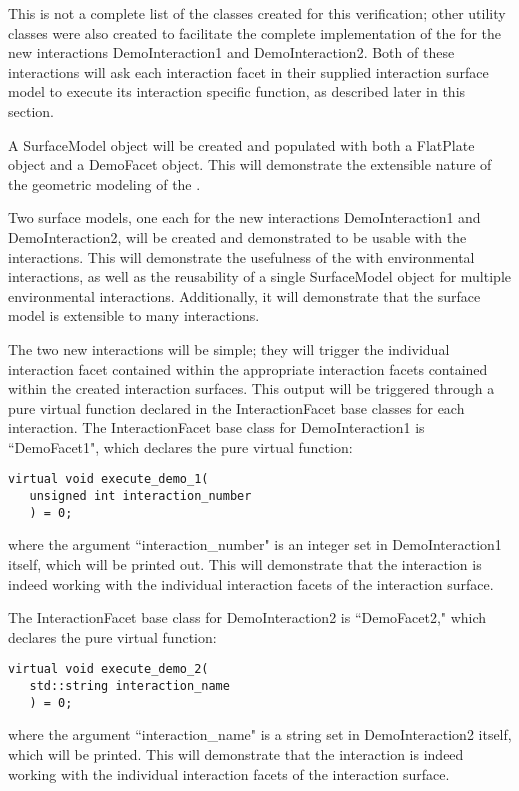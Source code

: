 \begin{description}
This is not a complete list of the classes created for this verification;
other utility classes were also created to facilitate the complete
implementation of the \ModelDesc for the new interactions
DemoInteraction1 and DemoInteraction2. Both of these interactions
will ask each interaction facet in their supplied interaction
surface model to execute its interaction specific function, as described
later in this section.

A SurfaceModel object will be created and populated with both a FlatPlate
object and a DemoFacet object. This will demonstrate the extensible
nature of the geometric modeling of the \ModelDesc.

Two surface models, one each for the new interactions DemoInteraction1
and DemoInteraction2, will be created and demonstrated to be usable
with the interactions. This will demonstrate the usefulness of the
\ModelDesc with environmental interactions, as well as
the reusability of a single SurfaceModel object for multiple
environmental interactions. Additionally, it will demonstrate that
the surface model is extensible to many interactions.

The two new interactions will be simple; they will trigger the individual
interaction facet contained within the appropriate interaction facets
contained within the created interaction surfaces. This output will
be triggered through a pure virtual function declared in the
InteractionFacet base classes for each interaction. The InteractionFacet
base class for DemoInteraction1 is ``DemoFacet1", which declares
the pure virtual function:

\begin{verbatim}
virtual void execute_demo_1(
   unsigned int interaction_number
   ) = 0;
\end{verbatim}

where the argument ``interaction\_number" is an integer set in
DemoInteraction1 itself, which will be printed out. This will
demonstrate that the interaction is indeed working with the individual
interaction facets of the interaction surface.

The InteractionFacet base class for DemoInteraction2 is ``DemoFacet2,"
which declares the pure virtual function:

\begin{verbatim}
virtual void execute_demo_2(
   std::string interaction_name
   ) = 0;
\end{verbatim}

where the argument ``interaction\_name" is a string set in
DemoInteraction2 itself, which will be printed. This will
demonstrate that the interaction is indeed working with the
individual interaction facets of the interaction surface.


\end{description}
